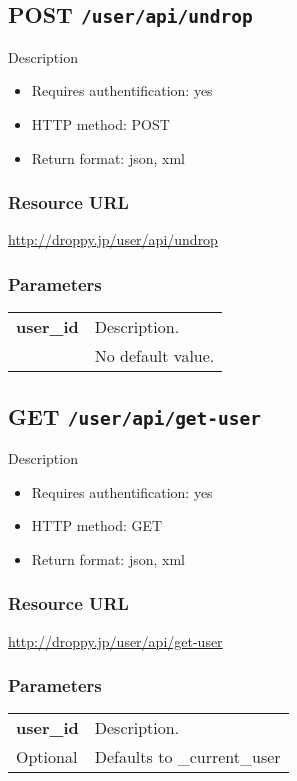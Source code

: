 \documentclass[11pt,a4paper]{article}
\newcommand{\content}[1]{\begin{minipage}{10cm}\vspace{2mm}#1\vspace{2mm}\end{minipage}}
\begin{document}
      \newpage
      
      
  \subsection*{POST {\tt /user/api/undrop}}
  Description
  \begin{itemize}
  \item Requires authentification: yes
  \item HTTP method: POST
  \item Return format: json, xml
  \end{itemize}
  \subsubsection*{Resource URL}
  \url{http://droppy.jp/user/api/undrop}
  \subsubsection*{Parameters}
  \begin{table}[h]
    \begin{center}
      \begin{tabular}{l l}
        \hline 
      \textbf{user\_id} & \content{Description. }
      \\
       & No default value.\\
      \hline
      \end{tabular}
    \end{center}
  \end{table}
  
      \newpage
      
      
  \subsection*{GET {\tt /user/api/get-user}}
  Description
  \begin{itemize}
  \item Requires authentification: yes
  \item HTTP method: GET
  \item Return format: json, xml
  \end{itemize}
  \subsubsection*{Resource URL}
  \url{http://droppy.jp/user/api/get-user}
  \subsubsection*{Parameters}
  \begin{table}[h]
    \begin{center}
      \begin{tabular}{l l}
        \hline 
      \textbf{user\_id} & \content{Description. }
      \\
      Optional & Defaults to \_current\_user\\
      \hline
      \end{tabular}
    \end{center}
  \end{table}
  
\end{document}
